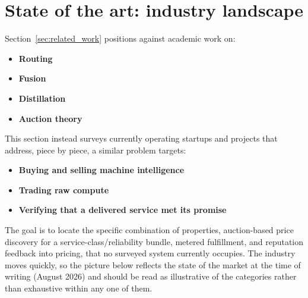 \section{State of the art: industry landscape}
\label{sec:state_of_the_art}

Section~\ref{sec:related_work} positions \Noesis{} against academic work on:

\begin{itemize}
  \item \textbf{Routing}
  \item \textbf{Fusion}
  \item \textbf{Distillation}
  \item \textbf{Auction theory}
\end{itemize}

This section instead surveys currently operating startups and projects that
address, piece by piece, a similar problem \Noesis{} targets:

\begin{itemize}
  \item \textbf{Buying and selling machine intelligence}
  \item \textbf{Trading raw compute}
  \item \textbf{Verifying that a delivered service met its promise}
\end{itemize}

The goal is to locate the specific combination of properties,
auction-based price discovery for a service-class/reliability bundle,
metered fulfillment, and reputation feedback into pricing, that no surveyed
system currently occupies. The industry moves quickly, so the picture below
reflects the state of the market at the time of writing (August 2026) and
should be read as illustrative of the categories rather than exhaustive within
any one of them.


